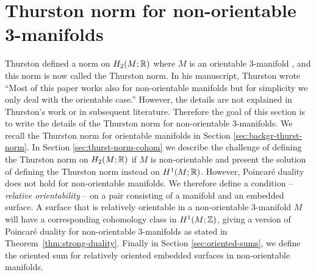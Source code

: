 \section{Thurston norm for non-orientable 3-manifolds}
\label{sec:thur-norm-non-orientable}
Thurston defined a norm on $H_2(M;\mathbb{R})$ where $M$ is an orientable 3-manifold \cite{thurston1986norm}, and this norm is now called the Thurston norm.  In his manuscript, Thurston wrote ``Most of this paper works also for non-orientable manifolds but for simplicity we only deal with the orientable case.''  However, the details are not explained in Thurston's work or in subsequent literature.  Therefore the goal of this section is to write the details of the Thurston norm for non-orientable 3-manifolds.
We recall the Thurston norm for orientable manifolds in Section \ref{sec:backgr-thurst-norm}.
In Section \ref{sec:thurst-norm-cohom} we describe the challenge of defining the Thurston norm on $H_2(M;\mathbb{R})$ if $M$ is non-orientable and present the solution of defining the Thurston norm instead on $H^1(M;\mathbb{R})$.
However, Poincar\'e duality does not hold for non-orientable manifolds.
We therefore define a condition -- {\it relative orientability} -- on a pair consisting of a manifold and an embedded surface.
A surface that is relatively orientable in a non-orientable 3-manifold $M$ will have a corresponding cohomology class in $H^1(M;\mathbb{Z})$, giving a version of Poincar\'e duality for non-orientable 3-manifolds as stated in Theorem~\ref{thm:strong-duality}.
Finally in Section \ref{sec:oriented-sums}, we define the oriented sum for relatively oriented embedded surfaces in non-orientable manifolds.



